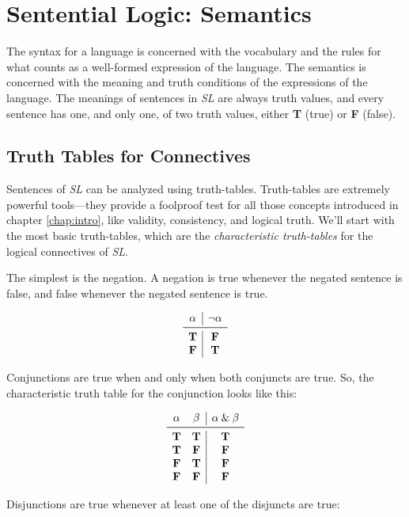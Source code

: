 \documentclass[../logic-text.tex]{subfiles}
\begin{document}
\chapter{Sentential Logic: Semantics}
\label{cha:sent-logic-semant}

The syntax for a language is concerned with the vocabulary and the rules for what counts as a well-formed expression of the language.
The semantics is concerned with the meaning and truth conditions of the expressions of the language.
The meanings of sentences in \emph{SL} are always truth values, and every sentence has one, and only one, of two truth values, either \textbf{T} (true) or \textbf{F} (false).

\section{Truth Tables for Connectives}
\label{sec:truth-tabl-conn}

Sentences of \emph{SL} can be analyzed using truth-tables.
Truth-tables are extremely powerful tools---they provide a foolproof test for all those concepts introduced in chapter \ref{chap:intro}, like validity, consistency, and logical truth.
We'll start with the most basic truth-tables, which are the \emph{characteristic truth-tables} for the logical connectives of \emph{SL}.


The simplest is the negation.
A negation is true whenever the negated sentence is false, and false whenever the negated sentence is true.

\[
\begin{array}{c|c}
  \alpha & \lneg \alpha \\ \midrule
  \true  & \false  \\
  \false  & \true
\end{array}
\]

Conjunctions are true when and only when both conjuncts are true.
So, the characteristic truth table for the conjunction looks like this:


\[
\begin{array}{cc|c}
  \alpha & \beta & \alpha  \land   \beta \\ \midrule
  \true & \true &  \true  \\
  \true & \false &  \false  \\
  \false & \true &  \false  \\
  \false & \false &  \false
\end{array}
\]


Disjunctions are true whenever at least one of the disjuncts are true:
\end{document}
